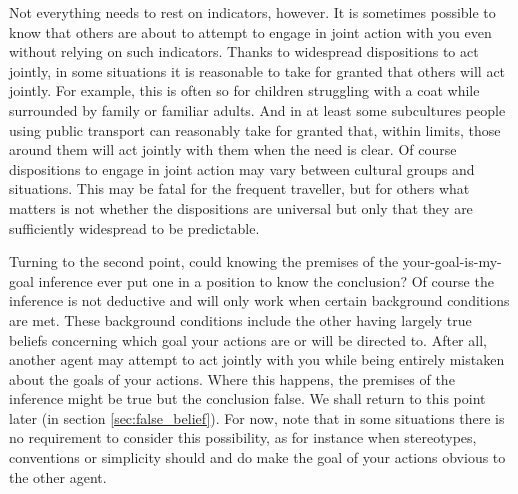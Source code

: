 \documentclass[12pt,\papersize]{extarticle}
\begin{document}
Not everything needs to rest on indicators, however.
It is sometimes possible to know that others are about to attempt to engage in joint action with you even without relying on such indicators.  
Thanks to widespread dispositions to act jointly, in some situations it is reasonable to take for granted that others will act jointly.  
For example, this is often so for children struggling with a coat while surrounded by family or familiar adults.  
And in at least some subcultures people using public transport can reasonably take for granted that, within limits, those around them will act jointly with them when the need is clear.
Of course dispositions to engage in joint action may vary between cultural groups and situations.
This may be fatal for the frequent traveller,
but for others what matters is not whether the dispositions are universal but only that they are sufficiently widespread to be predictable.

Turning to the second point,
could knowing the premises of the your-goal-is-my-goal inference ever put one in a position to know the conclusion?  
Of course the inference is not deductive and will only work when certain background conditions are met.  
These background conditions include the other having largely true beliefs concerning which goal your actions are or will be directed to.
After all, another agent may attempt to act jointly with you while being entirely mistaken about the goals of your actions.
Where this happens, the premises of the inference might be true but the conclusion false.
We shall return to this point later (in section \vref{sec:false_belief}). 
For now, note that in some situations there is no requirement  to consider  this possibility, as for instance when stereotypes, conventions or simplicity should and do make the goal of your actions obvious to the other agent. 
\end{document}
